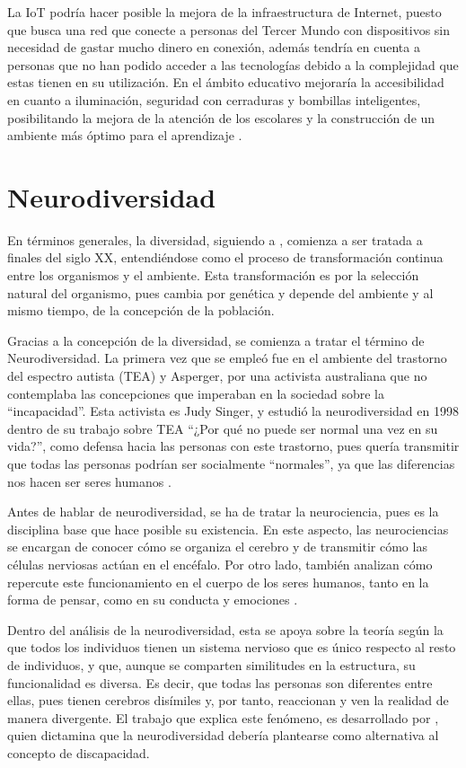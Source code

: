 \documentclass[spanish]{textolivre}
\begin{document}
La IoT podría hacer posible la mejora de la infraestructura de Internet, puesto que busca una red que conecte a personas del Tercer Mundo con dispositivos sin necesidad de gastar mucho dinero en conexión, además tendría en cuenta a personas que no han podido acceder a las tecnologías debido a la complejidad que estas tienen en su utilización. En el ámbito educativo mejoraría la accesibilidad en cuanto a iluminación, seguridad con cerraduras y bombillas inteligentes, posibilitando la mejora de la atención de los escolares y la construcción de un ambiente más óptimo para el aprendizaje \cite{cpv__incorporando_2020}.

\section{Neurodiversidad}

En términos generales, la diversidad, siguiendo a \textcite{lewontin_evolucion_1986}, comienza a ser tratada a finales del siglo XX, entendiéndose como el proceso de transformación continua entre los organismos y el ambiente. Esta transformación es por la selección natural del organismo, pues cambia por genética y depende del ambiente y al mismo tiempo, de la concepción de la población.

Gracias a la concepción de la diversidad, se comienza a tratar el término de Neurodiversidad. La primera vez que se empleó fue en el ambiente del trastorno del espectro autista (TEA) y Asperger, por una activista australiana que no contemplaba las concepciones que imperaban en la sociedad sobre la “incapacidad”. Esta activista es Judy Singer, y estudió la neurodiversidad en 1998 dentro de su trabajo sobre TEA “¿Por qué no puede ser normal una vez en su vida?”, como defensa hacia las personas con este trastorno, pues quería transmitir que todas las personas podrían ser socialmente “normales”, ya que las diferencias nos hacen ser seres humanos \cite{amstrong_special_2005}.

Antes de hablar de neurodiversidad, se ha de tratar la neurociencia, pues es la disciplina base que hace posible su existencia. En este aspecto, las neurociencias se encargan de conocer cómo se organiza el cerebro y de transmitir cómo las células nerviosas actúan en el encéfalo. Por otro lado, también analizan cómo repercute este funcionamiento en el cuerpo de los seres humanos, tanto en la forma de pensar, como en su conducta y emociones \cite{kandel_neurociencia_1997}.

Dentro del análisis de la neurodiversidad, esta se apoya sobre la teoría según la que todos los individuos tienen un sistema nervioso que es único respecto al resto de individuos, y que, aunque se comparten similitudes en la estructura, su funcionalidad es diversa. Es decir, que todas las personas son diferentes entre ellas, pues tienen cerebros disímiles y, por tanto, reaccionan y ven la realidad de manera divergente. El trabajo que explica este fenómeno, es desarrollado por \textcite{sanchez_paradigma_2020}, quien dictamina que la neurodiversidad debería plantearse como alternativa al concepto de discapacidad.
\end{document}
